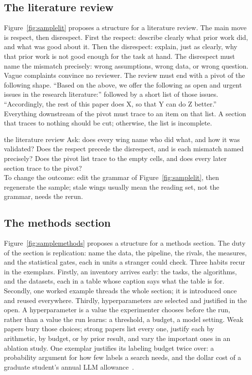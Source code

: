 \subsection{The literature review}
\label{sec:litrev}




Figure~\ref{fig:samplelit} proposes a structure for a literature
review.
The main move is respect, then disrespect.
First the respect: describe clearly what prior work did, and what
was good about it.
Then the disrespect: explain, just as clearly, why that prior
work is not good enough for the task at hand.
The disrespect must name the mismatch precisely: wrong
assumptions, wrong data, or wrong question.
Vague complaints convince no reviewer.
The review must end with a pivot of the following shape.
``Based on the above, we offer the following as open and urgent
issues in the research literature:'' followed by a short list of
those issues.
``Accordingly, the rest of this paper does X, so that Y can do Z
better.''
Everything downstream of the pivot must trace to an item on that
list.
A section that traces to nothing should be cut; otherwise, the
list is incomplete.

\begin{pause}{the literature review}
Ask: does every wing name who did what, and how it was validated?
Does the respect precede the disrespect, and is each mismatch
named precisely?
Does the pivot list trace to the empty cells, and does every
later section trace to the pivot?\\[0.2em]
To change the outcome: edit the grammar of
Figure~\ref{fig:samplelit}, then regenerate the sample; stale
wings usually mean the reading set, not the grammar, needs the
rerun.
\end{pause}

\subsection{The methods section}
\label{sec:methods}



Figure~\ref{fig:samplemethods} proposes a structure for a methods
section.
The duty of the section is replication: name the data, the
pipeline, the rivals, the measures, and the statistical gates,
each in units a stranger could check.
Three habits recur in the exemplars.
Firstly, an inventory arrives early: the tasks, the algorithms,
and the datasets, each in a table whose caption says what the
table is for.
Secondly, one worked example threads the whole section; it is
introduced once and reused everywhere.
Thirdly, hyperparameters are selected and justified in the open.
A hyperparameter is a value the experimenter chooses before the
run, rather than a value the run learns: a threshold, a budget,
a model setting.
Weak papers bury those choices; strong papers list every one,
justify each by arithmetic, by budget, or by prior result, and
vary the important ones in an ablation study.
One exemplar justifies its labeling budget twice over: a
probability argument for how few labels a search needs, and the
dollar cost of a graduate student's annual LLM
allowance~\cite{srinivasan26}.

